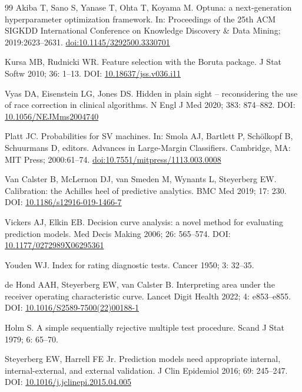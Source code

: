 \documentclass[11pt,a4paper]{article}
\begin{document}
\begin{thebibliography}{99}
 Akiba T, Sano S, Yanase T, Ohta T, Koyama M. Optuna: a next-generation hyperparameter optimization framework. In: Proceedings of the 25th ACM SIGKDD International Conference on Knowledge Discovery \& Data Mining; 2019:2623--2631. \href{https://doi.org/10.1145/3292500.3330701}{doi:10.1145/3292500.3330701}

 Kursa MB, Rudnicki WR. Feature selection with the Boruta package. J Stat Softw 2010; 36: 1--13. DOI: \href{https://doi.org/10.18637/jss.v036.i11}{10.18637/jss.v036.i11}

 Vyas DA, Eisenstein LG, Jones DS. Hidden in plain sight -- reconsidering the use of race correction in clinical algorithms. N Engl J Med 2020; 383: 874--882. DOI: \href{https://doi.org/10.1056/NEJMms2004740}{10.1056/NEJMms2004740}

 Platt JC. Probabilities for SV machines. In: Smola AJ, Bartlett P, Sch\"olkopf B, Schuurmans D, editors. Advances in Large-Margin Classifiers. Cambridge, MA: MIT Press; 2000:61--74. \href{https://doi.org/10.7551/mitpress/1113.003.0008}{doi:10.7551/mitpress/1113.003.0008}

 Van Calster B, McLernon DJ, van Smeden M, Wynants L, Steyerberg EW. Calibration: the Achilles heel of predictive analytics. BMC Med 2019; 17: 230. DOI: \href{https://doi.org/10.1186/s12916-019-1466-7}{10.1186/s12916-019-1466-7}

 Vickers AJ, Elkin EB. Decision curve analysis: a novel method for evaluating prediction models. Med Decis Making 2006; 26: 565--574. DOI: \href{https://doi.org/10.1177/0272989X06295361}{10.1177/0272989X06295361}

 Youden WJ. Index for rating diagnostic tests. Cancer 1950; 3: 32--35.

 de Hond AAH, Steyerberg EW, van Calster B. Interpreting area under the receiver operating characteristic curve. Lancet Digit Health 2022; 4: e853--e855. DOI: \href{https://doi.org/10.1016/S2589-7500(22)00188-1}{10.1016/S2589-7500(22)00188-1}

 Holm S. A simple sequentially rejective multiple test procedure. Scand J Stat 1979; 6: 65--70.

 Steyerberg EW, Harrell FE Jr. Prediction models need appropriate internal, internal-external, and external validation. J Clin Epidemiol 2016; 69: 245--247. DOI: \href{https://doi.org/10.1016/j.jclinepi.2015.04.005}{10.1016/j.jclinepi.2015.04.005}


\end{thebibliography}
\end{document}
